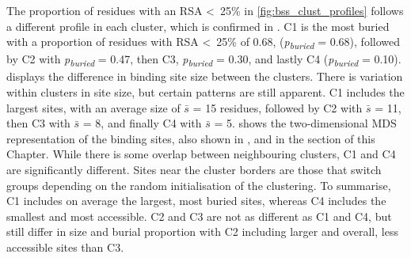 The proportion of residues with an RSA \textless~25\% in \autoref{fig:bss_clust_profiles} follows a different profile in each cluster, which is confirmed in . C1 is the most buried with a proportion of residues with RSA \textless~25\% of 0.68, (\textit{p\textsubscript{buried}} =  0.68), followed by C2 with \textit{p\textsubscript{buried}} = 0.47, then C3, \textit{p\textsubscript{buried}} = 0.30, and lastly C4 (\textit{p\textsubscript{buried}} = 0.10).  displays the difference in binding site size between the clusters. There is variation within clusters in site size, but certain patterns are still apparent. C1 includes the largest sites, with an average size of $\bar{\textit{s}}$ = 15 residues, followed by C2 with $\bar{\textit{s}}$ = 11, then C3 with $\bar{\textit{s}}$ = 8, and finally C4 with $\bar{\textit{s}}$ = 5.  shows the two-dimensional MDS representation of the binding sites, also shown in , and  in the  section of this Chapter. While there is some overlap between neighbouring clusters, C1 and C4 are significantly different. Sites near the cluster borders are those that switch groups depending on the random initialisation of the clustering. To summarise, C1 includes on average the largest, most buried sites, whereas C4 includes the smallest and most accessible. C2 and C3 are not as different as C1 and C4, but still differ in size and burial proportion with C2 including larger and overall, less accessible sites than C3.


